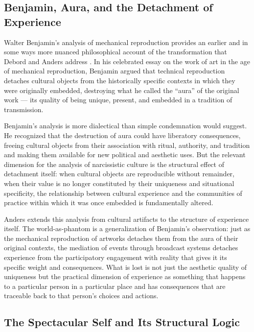 \documentclass[12pt]{memoir}
\begin{document}
\subsection{Benjamin, Aura, and the Detachment of Experience}

Walter Benjamin's analysis of mechanical reproduction provides an earlier and in some
ways more nuanced philosophical account of the transformation that Debord and Anders
address \citep{benjamin1969illuminations}. In his celebrated essay on the work of
art in the age of mechanical reproduction, Benjamin argued that technical reproduction
detaches cultural objects from the historically specific contexts in which they were
originally embedded, destroying what he called the \enquote{aura} of the original
work — its quality of being unique, present, and embedded in a tradition of transmission.

Benjamin's analysis is more dialectical than simple condemnation would suggest. He
recognized that the destruction of aura could have liberatory consequences, freeing
cultural objects from their association with ritual, authority, and tradition and
making them available for new political and aesthetic uses. But the relevant
dimension for the analysis of narcissistic culture is the structural effect of
detachment itself: when cultural objects are reproducible without remainder, when
their value is no longer constituted by their uniqueness and situational specificity,
the relationship between cultural experience and the communities of practice within
which it was once embedded is fundamentally altered.

Anders extends this analysis from cultural artifacts to the structure of experience
itself. The world-as-phantom is a generalization of Benjamin's observation: just as
the mechanical reproduction of artworks detaches them from the aura of their original
contexts, the mediation of events through broadcast systems detaches experience from
the participatory engagement with reality that gives it its specific weight and
consequences. What is lost is not just the aesthetic quality of uniqueness but the
practical dimension of experience as something that happens to a particular person
in a particular place and has consequences that are traceable back to that person's
choices and actions.

\subsection{The Spectacular Self and Its Structural Logic}
\end{document}
